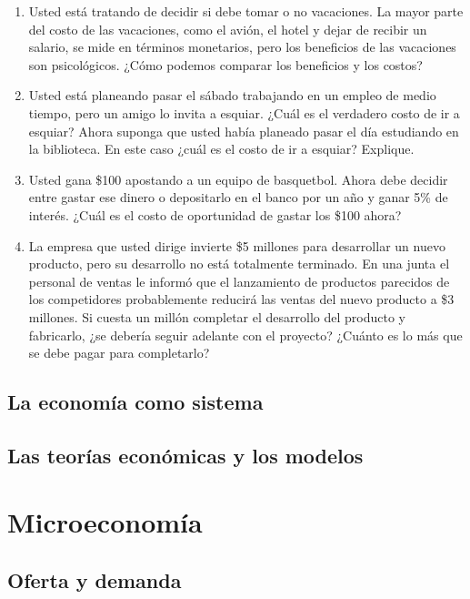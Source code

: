 \documentclass[
  letterpaper,
  DIV=11,
  numbers=noendperiod,
  oneside]{scrreprt}
\providecommand{\tightlist}{%
  \setlength{\itemsep}{0pt}\setlength{\parskip}{0pt}}\usepackage{longtable,booktabs,array}
\begin{document}
\begin{enumerate}
  \begin{enumerate}
  \def\labelenumii{\arabic{enumii}.}
  \tightlist
  \item
    Una familia que está pensando en comprar un automóvil nuevo.
  \item
    Un miembro del Congreso que debe decidir cuánto gastar en parques
    acionales.
  \item
    El presidente de una empresa que debe decidir abrir o no una nueva
    1ábrica.
  \item
    El profesor que decide por cuánto tiempo preparar su clase.
  \item
    Alguien recién egresado de la universidad que decide si cursar o no
    una maestría.
  \end{enumerate}
\item
  Usted está tratando de decidir si debe tomar o no vacaciones. La mayor
  parte del costo de las vacaciones, como el avión, el hotel y dejar de
  recibir un salario, se mide en términos monetarios, pero los
  beneficios de las vacaciones son psicológicos. ¿Cómo podemos comparar
  los beneficios y los costos?
\item
  Usted está planeando pasar el sábado trabajando en un empleo de medio
  tiempo, pero un amigo lo invita a esquiar. ¿Cuál es el verdadero costo
  de ir a esquiar? Ahora suponga que usted había planeado pasar el día
  estudiando en la biblioteca. En este caso ¿cuál es el costo de ir a
  esquiar? Explique.
\item
  Usted gana \$100 apostando a un equipo de basquetbol. Ahora debe
  decidir entre gastar ese dinero o depositarlo en el banco por un año y
  ganar 5\% de interés. ¿Cuál es el costo de oportunidad de gastar los
  \$100 ahora?
\item
  La empresa que usted dirige invierte \$5 millones para desarrollar un
  nuevo producto, pero su desarrollo no está totalmente terminado. En
  una junta el personal de ventas le informó que el lanzamiento de
  productos parecidos de los competidores probablemente reducirá las
  ventas del nuevo producto a \$3 millones. Si cuesta un millón
  completar el desarrollo del producto y fabricarlo, ¿se debería seguir
  adelante con el proyecto? ¿Cuánto es lo más que se debe pagar para
  completarlo?
\end{enumerate}

\chapter{La economía como sistema}\label{la-economuxeda-como-sistema}

\chapter{Las teorías económicas y los
modelos}\label{las-teoruxedas-econuxf3micas-y-los-modelos}

\part{Microeconomía}

\chapter{Oferta y demanda}\label{oferta-y-demanda}
\end{document}
